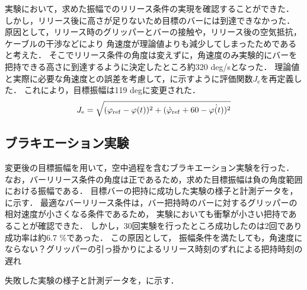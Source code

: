           実験において，求めた振幅でのリリース条件の実現を確認することができた．
          しかし，リリース後に高さが足りないため目標のバーには到達できなかった．
          原因として，リリース時のグリッパーとバーの接触や，リリース後の空気抵抗，ケーブルの干渉などにより
          角速度が理論値よりも減少してしまったためであると考えた．
          そこでリリース条件の角度は変えずに，角速度のみ実験的にバーを把持できる高さに到達するように決定したところ約320 deg/sとなった．
          理論値と実際に必要な角速度との誤差を考慮して，に示すように評価関数$J_{\mathrm{e}}$を再定義した．
          これにより，目標振幅は119 degに変更された．
          \begin{eqnarray}
            \equlabel{error2}
            J_{\mathrm{e}}=\sqrt{(\varphi_{\mathrm{ref}}-\varphi(t))^2+(\dot{\varphi}_{\mathrm{ref}}+60-\dot{\varphi(t)})^2}
          \end{eqnarray}
          
          \subsection{ブラキエーション実験}
          変更後の目標振幅を用いて，空中過程を含むブラキエーション実験を行った．
          なお，バーリリース条件の角度は正であるため，求めた目標振幅は負の角度範囲における振幅である．
          目標バーの把持に成功した実験の様子と計測データを\figref{}，\figref{}に示す．
          最適なバーリリース条件は，バー把持時のバーに対するグリッパーの相対速度が小さくなる条件であるため，
          実験においても衝撃が小さい把持であることが確認できた．
          しかし，30回実験を行ったところ成功したのは2回であり成功率は約6.7 $\%$であった．
          この原因として，
          振幅条件を満たしても，角速度にならない？グリッパーの引っ掛かりによるリリース時刻のずれによる把持時刻の遅れ

          失敗した実験の様子と計測データを\figref{}，\figref{}に示す．
          

          \newpage




      
        

